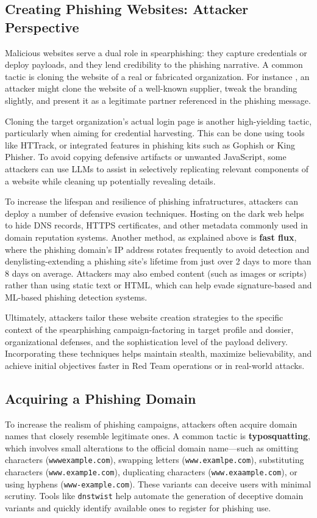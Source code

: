 \subsection{Creating Phishing Websites: Attacker Perspective}
Malicious websites serve a dual role in spearphishing: they capture credentials or deploy payloads, and they lend credibility to the phishing narrative. A common tactic is cloning the website of a real or fabricated organization. For instance , an attacker might clone the website of a well-known supplier, tweak the branding slightly, and present it as a legitimate partner referenced in the phishing message.

Cloning the target organization's actual login page is another high-yielding tactic, particularly when aiming for credential harvesting. This can be done using tools like HTTrack, or integrated features in phishing kits such as Gophish or King Phisher. To avoid copying defensive artifacts or unwanted JavaScript, some attackers can use LLMs to assist in selectively replicating relevant components of a website while cleaning up potentially revealing details.

To increase the lifespan and resilience of phishing infratructures, attackers can deploy a number of defensive evasion techniques. Hosting on the dark web helps to hide DNS records, HTTPS certificates, and other metadata commonly used in domain reputation systems. Another method, as explained above is \textbf{fast flux}, where the phishing domain's IP address rotates frequently to avoid detection and denylisting-extending a phishing site's lifetime from just over 2 days to more than 8 days on average. Attackers may also embed content (such as images or scripts) rather than using static text or HTML, which can help evade signature-based and ML-based phishing detection systems.

Ultimately, attackers tailor these website creation strategies to the specific context of the spearphishing campaign-factoring in target profile and dossier, organizational defenses, and the sophistication level of the payload delivery. Incorporating these techniques helps maintain stealth, maximize believability, and achieve initial objectives faster in Red Team operations or in real-world attacks.

\subsection{Acquiring a Phishing Domain}
To increase the realism of phishing campaigns, attackers often acquire domain names that closely resemble legitimate ones. A common tactic is \textbf{typosquatting}, which involves small alterations to the official domain name—such as omitting characters (\verb|wwwexample.com|), swapping letters (\verb|www.examlpe.com|), substituting characters (\verb|www.examp1e.com|), duplicating characters (\verb|www.exaample.com|), or using hyphens (\verb|www-example.com|). These variants can deceive users with minimal scrutiny. Tools like \verb|dnstwist| help automate the generation of deceptive domain variants and quickly identify available ones to register for phishing use.

